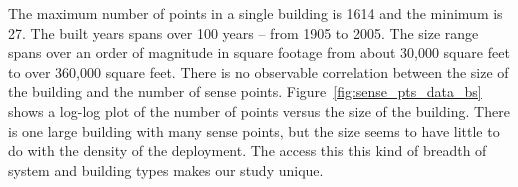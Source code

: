The maximum number of points in a 
single building is 1614 and the minimum is 27.   The built years spans over 100 years -- from 
1905 to 2005. The size range spans over an order of magnitude 
in square footage from about 30,000 square feet to over 360,000 square feet.  There is no
observable correlation between the size of the building and the number of sense points.
Figure~\ref{fig:sense_pts_data_bs} shows a log-log plot of the number of points versus
the size of the building.  There is one large building with many sense points, but the size
seems to have little to do with the density of the deployment.
The access this
this kind of breadth of system and building types makes our study unique.









%

% 



